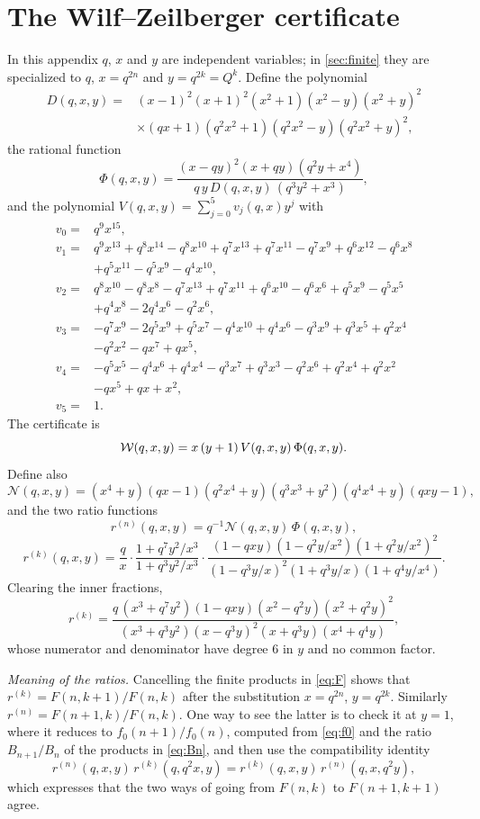 \section{The Wilf--Zeilberger certificate}\label{app:cert}

In this appendix $q$, $x$ and $y$ are independent variables; in
\cref{sec:finite} they are specialized to $q$, $x=q^{2n}$ and $y=q^{2k}=Q^k$.
Define the polynomial
\[
\begin{aligned}
D(q,x,y)={}&(x-1)^2(x+1)^2(x^2+1)(x^2-y)(x^2+y)^2\\
&\times(qx+1)(q^2x^2+1)(q^2x^2-y)(q^2x^2+y)^2,
\end{aligned}
\]
the rational function
\[
\Phi(q,x,y)=\frac{(x-qy)^2(x+qy)(q^2y+x^4)}{q\,y\,D(q,x,y)\,(q^3y^2+x^3)},
\]
and the polynomial $V(q,x,y)=\sum_{j=0}^5v_j(q,x)y^j$ with
\[
\begin{aligned}
v_0={}&q^9x^{15},\\
v_1={}&q^9x^{13}+q^8x^{14}-q^8x^{10}+q^7x^{13}+q^7x^{11}-q^7x^9+q^6x^{12}-q^6x^8\\
&+q^5x^{11}-q^5x^9-q^4x^{10},\\
v_2={}&q^8x^{10}-q^8x^8-q^7x^{13}+q^7x^{11}+q^6x^{10}-q^6x^6+q^5x^9-q^5x^5\\
&+q^4x^8-2q^4x^6-q^2x^6,\\
v_3={}&-q^7x^9-2q^5x^9+q^5x^7-q^4x^{10}+q^4x^6-q^3x^9+q^3x^5+q^2x^4\\
&-q^2x^2-qx^7+qx^5,\\
v_4={}&-q^5x^5-q^4x^6+q^4x^4-q^3x^7+q^3x^3-q^2x^6+q^2x^4+q^2x^2\\
&-qx^5+qx+x^2,\\
v_5={}&1.
\end{aligned}
\]
The certificate is
\[
\mathcal{W}(q,x,y)=x\,(y+1)\,V(q,x,y)\,\Phi(q,x,y).
\]
Define also
\[
\mathcal N(q,x,y)=(x^4+y)(qx-1)(q^2x^4+y)(q^3x^3+y^2)(q^4x^4+y)(qxy-1),
\]
and the two ratio functions
\[
r^{(n)}(q,x,y)=q^{-1}\mathcal N(q,x,y)\,\Phi(q,x,y),
\]
\[
r^{(k)}(q,x,y)=\frac qx\cdot\frac{1+q^7y^2/x^3}{1+q^3y^2/x^3}\cdot
\frac{(1-qxy)(1-q^2y/x^2)(1+q^2y/x^2)^2}{(1-q^3y/x)^2(1+q^3y/x)(1+q^4y/x^4)} .
\]
Clearing the inner fractions,
\[
r^{(k)}=\frac{q\,(x^3+q^7y^2)(1-qxy)(x^2-q^2y)(x^2+q^2y)^2}
{(x^3+q^3y^2)(x-q^3y)^2(x+q^3y)(x^4+q^4y)},
\]
whose numerator and denominator have degree $6$ in $y$ and no common factor.

\emph{Meaning of the ratios.} Cancelling the finite products in \eqref{eq:F}
shows that $r^{(k)}=F(n,k+1)/F(n,k)$ after the substitution $x=q^{2n}$,
$y=q^{2k}$. Similarly $r^{(n)}=F(n+1,k)/F(n,k)$. One way to see the latter is to
check it at $y=1$, where it reduces to $f_0(n+1)/f_0(n)$, computed from
\eqref{eq:f0} and the ratio $B_{n+1}/B_n$ of the products in \eqref{eq:Bn},
and then use the compatibility identity
\begin{equation}\label{eq:compat}
r^{(n)}(q,x,y)\,r^{(k)}(q,q^2x,y)=r^{(k)}(q,x,y)\,r^{(n)}(q,x,q^2y),
\end{equation}
which expresses that the two ways of going from $F(n,k)$ to $F(n+1,k+1)$ agree.

